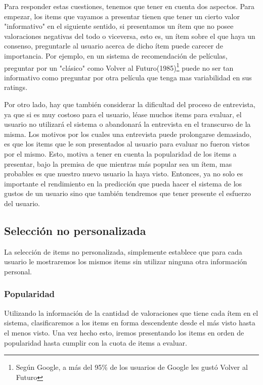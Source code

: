 \documentclass[hidelinks,12pt,a4paper]{book}
\theoremstyle{plain}
\theoremstyle{definition}
\begin{document}
Para responder estas cuestiones, tenemos que tener en cuenta dos aspectos. Para empezar, los items que vayamos a presentar tienen que tener un cierto valor "informativo" en el siguiente sentido, si presentamos un ítem que no posee valoraciones negativas del todo o viceversa, esto es, un ítem sobre el que haya un consenso, preguntarle al usuario acerca de dicho ítem puede carecer de importancia. Por ejemplo, en un sistema de recomendación de películas, preguntar por un "clásico" como Volver al Futuro(1985)\footnote{Según Google, a más del 95\% de los usuarios de Google les gustó Volver al Futuro} puede no ser tan informativo como preguntar por otra película que tenga mas variabilidad en sus ratings. 

Por otro lado, hay que también considerar la dificultad del proceso de entrevista, ya que si es muy costoso para el usuario, léase muchos items para evaluar, el usuario no utilizará el sistema o abandonará la entrevista en el transcurso de la misma\cite{CS:rashid2002getting}. Los motivos por los cuales una entrevista puede prolongarse demasiado, es que los items que le son presentados al usuario para evaluar no fueron vistos por el mismo. Esto, motiva a tener en cuenta la popularidad de los items a presentar, bajo la premisa de que mientras más popular sea un ítem, mas probables es que nuestro nuevo usuario la haya visto. Entonces, ya no solo es importante el rendimiento en la predicción que pueda hacer el sistema de los gustos de un usuario sino que también tendremos que tener presente el esfuerzo del usuario.

\subsection{Selección no personalizada}\label{entrevistas}

La selección de items no personalizada, simplemente establece que para cada usuario le mostraremos los mismos items sin utilizar ninguna otra información personal.

\subsubsection{Popularidad}

Utilizando la información de la cantidad de valoraciones que tiene cada ítem en el sistema, clasificaremos a los items en forma descendente desde el más visto hasta el menos visto. Una vez hecho esto, iremos presentando los items en orden de popularidad hasta cumplir con la cuota de items a evaluar.
\end{document}
